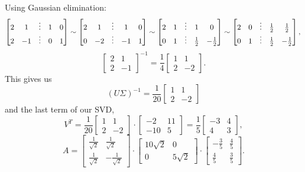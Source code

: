 \documentclass[14pt, notitlepage]{article}
\begin{document}
Using Gaussian elimination:
\[
    \begin{bmatrix}
        2 & 1  & \vdots & 1 & 0 \\
        2 & -1 & \vdots & 0 & 1
    \end{bmatrix} \sim \begin{bmatrix}
        2 & 1  & \vdots & 1 & 0 \\
        0 & -2 & \vdots & -1 & 1 \\
    \end{bmatrix} \sim \begin{bmatrix}
        2 & 1  & \vdots & 1 & 0 \\
        0 & 1  & \vdots & \frac 12 & -\frac 12 
    \end{bmatrix} \sim \begin{bmatrix}
        2 & 0 & \vdots & \frac 12 & \frac 12 \\
        0 & 1  & \vdots & \frac 12 & -\frac 12
    \end{bmatrix}, \\
\] 
\[
    \begin{bmatrix}
        2 & 1 \\
        2 & -1
    \end{bmatrix}^{-1} = \frac 14 \begin{bmatrix}
        1 & 1 \\
        2 & -2
    \end{bmatrix}.
\]
This gives us
\[
    \left(U\Sigma\right)^{-1} = \frac 1{20} \begin{bmatrix}
        1 & 1 \\
        2 & -2
    \end{bmatrix}
\]
and the last term of our SVD,
\[
    V^T = \frac 1{20} \begin{bmatrix}
        1 & 1 \\
        2 & -2
    \end{bmatrix} \cdot \begin{bmatrix}
        -2  & 11 \\
        -10 & 5
    \end{bmatrix} = \frac 15 \begin{bmatrix}
        -3 & 4 \\
        4 & 3
    \end{bmatrix},
\]
\[
    A = \begin{bmatrix}
        \frac{1}{\sqrt{2}} &  \frac{1}{\sqrt{2}} \\
        \frac{1}{\sqrt{2}} & -\frac{1}{\sqrt{2}}
    \end{bmatrix} \cdot \begin{bmatrix}
        10\sqrt{2} & 0 \\
        0 & 5\sqrt{2}
    \end{bmatrix} \cdot \begin{bmatrix}
        -\frac 35 & \frac 45 \\
         \frac 45 & \frac 35
    \end{bmatrix}.
\]
\end{document}
